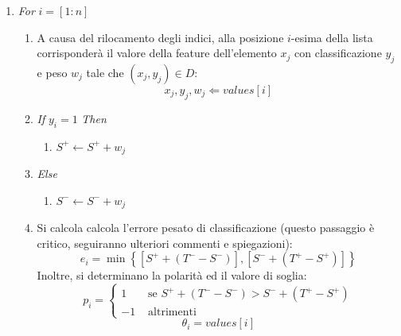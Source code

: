 \begin{enumerate}
\begin{enumerate}
                    \item \emph{For} $i = [1:n]$

                    \begin{enumerate}
                        \item A causa del rilocamento degli indici, alla posizione $i$-esima della lista corrisponderà il valore della feature dell'elemento $x_j$ con classificazione $y_j$ e peso $w_j$ tale che $(x_j, y_j) \in D$:
                        \begin{equation}
                            \label{subeq:indices_relocation}
                            x_j, y_j, w_j \Leftarrow values[i]
                        \end{equation}

                        \item \emph{If} $y_i = 1$ \emph{Then}
                        \begin{enumerate}
                            \item $S^+ \leftarrow S^+ + w_j$
                        \end{enumerate}
                        \item \emph{Else}
                        \begin{enumerate}
                            \item $S^- \leftarrow S^- + w_j$
                        \end{enumerate}

                        \item \label{best_classifier_p_theta}
                        Si calcola calcola l'errore pesato di classificazione (questo passaggio è critico, seguiranno ulteriori commenti e spiegazioni):
                        \begin{equation}
                            \label{subeq:weighted_error_calculus}
                            e_i = \min\left\{ \left[S^+ + (T^- - S^-)\right], \left[S^- + (T^+ - S^+)\right] \right\}
                        \end{equation}
                        Inoltre, si determinano la polarità ed il valore di soglia:
                        \begin{equation}
                            \label{subeq:polarity_assignment}
                            p_i = 
                            \begin{cases}
                                1 & \text{ se } S^+ + (T^- - S^-) > S^- + (T^+ - S^+) \\
                                -1 & \text{ altrimenti }
                            \end{cases}
                        \end{equation}
                        \begin{equation}
                            \label{subeq:threshold_assignment}
                            \theta_i = values[i]
                        \end{equation}


\end{enumerate}
\end{enumerate}
\end{enumerate}
